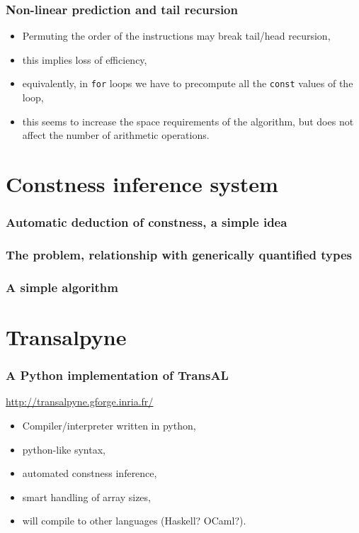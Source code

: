 \documentclass[10pt]{beamer}
\begin{document}

\begin{frame}
  \frametitle{Non-linear prediction and tail recursion}

  \begin{itemize}
  \item Permuting the order of the instructions may break tail/head
    recursion,
  \item this implies loss of efficiency,
  \item equivalently, in {\tt for} loops we have to precompute all the
    {\tt const} values of the loop,
  \item \alert{this seems to increase the space requirements of the
      algorithm}, but does not affect the number of arithmetic operations.
  \end{itemize}
\end{frame}


\section{Constness inference system}

\begin{frame}
  \frametitle{Automatic deduction of constness, a simple idea}

\end{frame}


\begin{frame}
  \frametitle{The problem, relationship with generically quantified types}

\end{frame}


\begin{frame}
  \frametitle{A simple algorithm}

\end{frame}


\section{Transalpyne}

\begin{frame}
  \frametitle{A Python implementation of TransAL}

  \begin{center}
    \Large
    \url{http://transalpyne.gforge.inria.fr/}
  \end{center}

  \begin{itemize}
  \item Compiler/interpreter written in python,
  \item python-like syntax,
  \item automated constness inference,
  \item smart handling of array sizes,
  \item will compile to other languages (Haskell? OCaml?).
  \end{itemize}
\end{frame}
\end{document}

